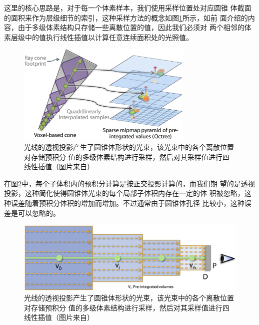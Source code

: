 这里的核心思路是，对于每一个体素样本，我们使用采样位置处对应圆锥 体截面的面积来作为层级细节的索引，这种采样方法的概念如图\ref{f:vct-7-4}所示，如前 面介绍的内容，由于多级体素结构只存储一些离散位置的值，因此我们必须对 两个相邻的体素层级中的值执行线性插值以计算任意连续面积处的光照值。

\begin{figure}
\begin{center}
	\includegraphics[width=0.75\textwidth]{figures/vct/vct-7-4}
\end{center}
	\caption{光线的透视投影产生了圆锥体形状的光束，该光束中的各个离散位置对存储预积分 值的多级体素结构进行采样，然后对其采样值进行四线性插值（图片来自\cite{a:InteractiveIndirectIlluminationUsingVoxelConeTracing}）}
	\label{f:vct-7-4}
\end{figure}

在图\ref{f:vct-7-5}中，每个子体积内的预积分计算是按正交投影计算的，而我们期 望的是透视投影，这种简化使得圆锥体光束的每个局部子体积内存在一定的体 积被忽略，这种误差随着预积分体积的增加而增加。不过通常由于圆锥体孔径 比较小，这种误差是可以忽略的。

\begin{figure}
	\includegraphics[width=\textwidth]{figures/vct/vct-7-5}
	\caption{光线的透视投影产生了圆锥体形状的光束，该光束中的各个离散位置对存储预积分 值的多级体素结构进行采样，然后对其采样值进行四线性插值（图片来自\cite{a:InteractiveIndirectIlluminationUsingVoxelConeTracing}）}
	\label{f:vct-7-5}
\end{figure}



